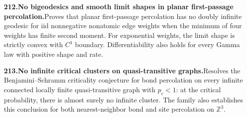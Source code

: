 \documentclass[11pt,a4paper]{article}
\begin{document}
  \par \begin{minipage}{\linewidth}
  \fontsize{10.5}{12.6}\selectfont\RaggedRight
  \hypertarget{result 212}{}
  {\bfseries\textcolor{muted}{212.}\enspace No bigeodesics and smooth limit shapes in planar first-passage percolation.}\enspace Proves that planar first-passage percolation has no doubly infinite geodesic for iid nonnegative nonatomic edge weights when the minimum of four weights has finite second moment. For exponential weights, the limit shape is strictly convex with $C^1$ boundary. Differentiability also holds for every Gamma law with positive shape and rate.\par
  \end{minipage}\par\vspace{5pt}



  \par \begin{minipage}{\linewidth}
  \fontsize{10.5}{12.6}\selectfont\RaggedRight
  \hypertarget{result 213}{}
  {\bfseries\textcolor{muted}{213.}\enspace No infinite critical clusters on quasi-transitive graphs.}\enspace Resolves the Benjamini--Schramm criticality conjecture for bond percolation on every infinite connected locally finite quasi-transitive graph with $p_c<1$: at the critical probability, there is almost surely no infinite cluster. The family also establishes this conclusion for both nearest-neighbor bond and site percolation on $\mathbb Z^3$.\par
  \end{minipage}\par\vspace{5pt}
\end{document}
